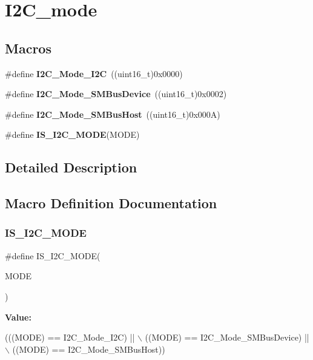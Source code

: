 \hypertarget{group___i2_c__mode}{}\section{I2\+C\+\_\+mode}
\label{group___i2_c__mode}
\subsection*{Macros}
\begin{DoxyCompactItemize}
\item 
\mbox{\label{group___i2_c__mode_ga8bc3b0555ca31b6f8423bc2ada45d1ac}} 
\#define {\bfseries I2\+C\+\_\+\+Mode\+\_\+\+I2C}~((uint16\+\_\+t)0x0000)
\item 
\mbox{\label{group___i2_c__mode_gaf0cf66bc1f4986ba8a9925da924e06da}} 
\#define {\bfseries I2\+C\+\_\+\+Mode\+\_\+\+S\+M\+Bus\+Device}~((uint16\+\_\+t)0x0002)
\item 
\mbox{\label{group___i2_c__mode_gacfd37619c8d91dea5dec2921840acede}} 
\#define {\bfseries I2\+C\+\_\+\+Mode\+\_\+\+S\+M\+Bus\+Host}~((uint16\+\_\+t)0x000\+A)
\item 
\#define {\bfseries I\+S\+\_\+\+I2\+C\+\_\+\+M\+O\+DE}(M\+O\+DE)
\end{DoxyCompactItemize}


\subsection{Detailed Description}


\subsection{Macro Definition Documentation}
\mbox{\label{group___i2_c__mode_ga58464e1fe94a79bab721137a544baf79}} 
\subsubsection{\texorpdfstring{I\+S\+\_\+\+I2\+C\+\_\+\+M\+O\+DE}{IS\_I2C\_MODE}}
{\footnotesize\ttfamily \#define I\+S\+\_\+\+I2\+C\+\_\+\+M\+O\+DE(\begin{DoxyParamCaption}\item[{}]{M\+O\+DE }\end{DoxyParamCaption})}

{\bfseries Value\+:}
\begin{DoxyCode}
(((MODE) == I2C\_Mode\_I2C) || \(\backslash\)
                           ((MODE) == I2C\_Mode\_SMBusDevice) || \(\backslash\)
                           ((MODE) == I2C\_Mode\_SMBusHost))
\end{DoxyCode}
